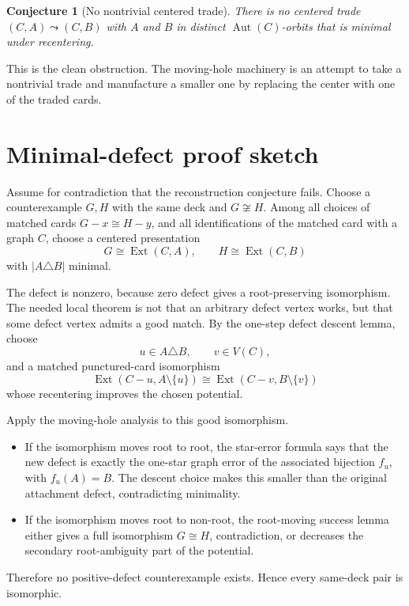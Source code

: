 \documentclass[11pt]{article}
\newtheorem{conjecture}{Conjecture}
\newcommand{\Ext}{\operatorname{Ext}}
\newcommand{\Aut}{\operatorname{Aut}}
\begin{document}
\begin{conjecture}[No nontrivial centered trade]
There is no centered trade \((C,A)\leadsto(C,B)\) with \(A\) and \(B\) in
distinct \(\Aut(C)\)-orbits that is minimal under recentering.
\end{conjecture}

This is the clean obstruction.  The moving-hole machinery is an attempt to
take a nontrivial trade and manufacture a smaller one by replacing the center
with one of the traded cards.

\section{Minimal-defect proof sketch}

Assume for contradiction that the reconstruction conjecture fails.  Choose a
counterexample \(G,H\) with the same deck and \(G \not\cong H\).  Among all
choices of matched cards \(G-x \cong H-y\), and all identifications of the
matched card with a graph \(C\), choose a centered presentation
\[
  G \cong \Ext(C,A),
  \qquad
  H \cong \Ext(C,B)
\]
with \(|A\triangle B|\) minimal.

The defect is nonzero, because zero defect gives a root-preserving isomorphism.
The needed local theorem is not that an arbitrary defect vertex works, but
that some defect vertex admits a good match.  By the one-step defect descent
lemma, choose
\[
  u\in A\triangle B,\qquad v\in V(C),
\]
and a matched punctured-card isomorphism
\[
  \Ext(C-u,A\setminus\{u\})
  \cong
  \Ext(C-v,B\setminus\{v\})
\]
whose recentering improves the chosen potential.

Apply the moving-hole analysis to this good isomorphism.

\begin{itemize}[leftmargin=2em]
  \item If the isomorphism moves root to root, the star-error formula says
  that the new defect is exactly the one-star graph error of the associated
  bijection \(f_u\), with \(f_u(A)=B\).  The descent choice makes this smaller than the
  original attachment defect, contradicting minimality.

  \item If the isomorphism moves root to non-root, the root-moving success lemma
  either gives a full isomorphism \(G \cong H\), contradiction, or decreases
  the secondary root-ambiguity part of the potential.
\end{itemize}

Therefore no positive-defect counterexample exists.  Hence every same-deck
pair is isomorphic.
\end{document}

